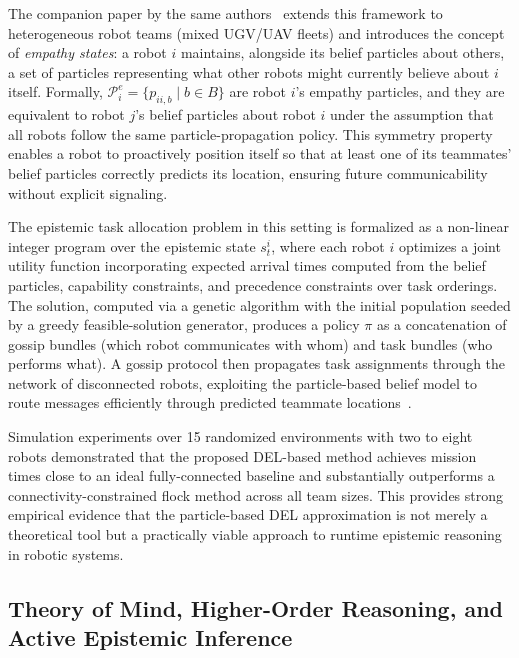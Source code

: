 \documentclass[12pt,a4paper]{article}
\theoremstyle{definition}
\theoremstyle{plain}
\begin{document}
The companion paper by the same authors~\cite{bramblett2023icra} extends this framework
to heterogeneous robot teams (mixed UGV/UAV fleets) and introduces the concept of
\textit{empathy states}: a robot $i$ maintains, alongside its belief particles about
others, a set of particles representing what other robots might currently believe about
$i$ itself. Formally, $\mathcal{P}^e_{i} = \{p_{ii,b} \mid b \in B\}$ are robot $i$'s
empathy particles, and they are equivalent to robot $j$'s belief particles about robot $i$
under the assumption that all robots follow the same particle-propagation policy. This
symmetry property enables a robot to proactively position itself so that at least
one of its teammates' belief particles correctly predicts its location, ensuring future
communicability without explicit signaling.

The epistemic task allocation problem in this setting is formalized as a non-linear integer
program over the epistemic state $s^i_t$, where each robot $i$ optimizes a joint
utility function incorporating expected arrival times computed from the belief particles,
capability constraints, and precedence constraints over task orderings. The solution,
computed via a genetic algorithm with the initial population seeded by a greedy
feasible-solution generator, produces a policy $\pi$ as a concatenation of gossip bundles
(which robot communicates with whom) and task bundles (who performs what). A gossip protocol
then propagates task assignments through the network of disconnected robots, exploiting
the particle-based belief model to route messages efficiently through predicted teammate
locations~\cite{bramblett2023icra, bramblett2023frontiers}.

Simulation experiments over 15 randomized environments with two to eight robots demonstrated
that the proposed DEL-based method achieves mission times close to an ideal fully-connected
baseline and substantially outperforms a connectivity-constrained flock method across all
team sizes. This provides strong empirical evidence that the particle-based DEL approximation
is not merely a theoretical tool but a practically viable approach to runtime epistemic
reasoning in robotic systems.

\subsection{Theory of Mind, Higher-Order Reasoning, and Active Epistemic Inference}
\label{subsec:tom_active_inference}
\end{document}
